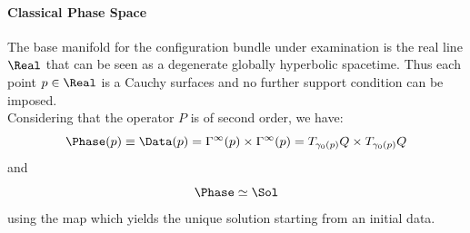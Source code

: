 \documentclass[Main]{subfiles}
\begin{document}
			\paragraph{Classical Phase Space}
				The base manifold for the configuration bundle under examination is the real line $\Real$ that can be seen as a degenerate globally hyperbolic spacetime.
				Thus each point $p\in \Real$ is a Cauchy surfaces and no further support condition can be imposed.\\
				Considering that the operator $P$ is of second order, we have:
				\begin{displaymath}
					\Phase(p) \equiv \Data(p) = \Gamma^\infty(p) \times \Gamma^\infty(p) =
					T_{\gamma_0(p)}Q \times T_{\gamma_0(p)}Q
				\end{displaymath}
				and
				\begin{displaymath}
					\Phase \simeq \Sol
				\end{displaymath}
				using the map which yields the unique solution starting from an initial data.
				
\end{document}

